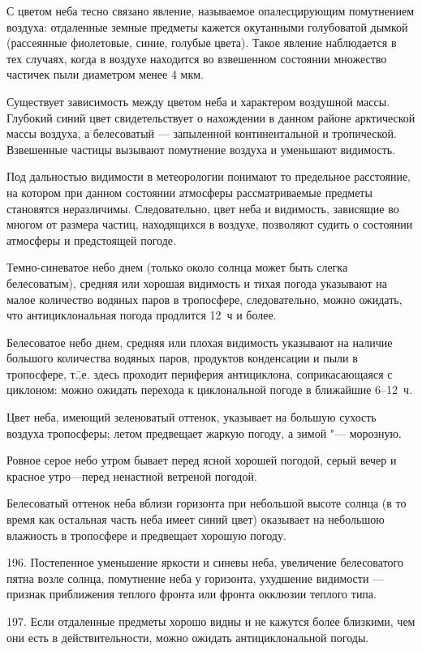 С цветом неба тесно связано явление, называемое опалесцирующим
помутнением воздуха: отдаленные земные предметы кажется окутанными
голубоватой дымкой (рассеянные фиолетовые, синие, голубые
цвета). Такое явление наблюдается в тех случаях, когда в воздухе
находится во взвешенном состоянии множество частичек пыли диаметром
менее 4 мкм.

Существует зависимость между цветом неба и характером воздушной
массы. Глубокий синий цвет свидетельствует о нахождении в данном
районе арктической массы воздуха, а белесоватый — запыленной
континентальной и тропической. Взвешенные частицы вызывают помутнение
воздуха и уменьшают видимость.

Под дальностью видимости в метеорологии понимают то предельное
расстояние, на котором при данном состоянии атмосферы рассматриваемые
предметы становятся неразличимы. Следовательно, цвет неба и видимость,
зависящие во многом от размера частиц, находящихся в воздухе,
позволяют судить о состоянии атмосферы и предстоящей погоде.

 Темно-синеватое небо днем (только около солнца может быть
слегка белесоватым), средняя или хорошая видимость и тихая погода
указывают на малое количество водяных паров в тропосфере,
следовательно, можно ожидать, что антициклональная погода продлится
12~ч и более.

 Белесоватое небо днем, средняя или плохая видимость указывают
на наличие большого количества водяных паров, продуктов конденсации и
пыли в тропосфере, т.\=,е. здесь проходит периферия антициклона,
соприкасающаяся с циклоном: можно ожидать перехода к циклональной
погоде в ближайшие 6--12~ч.

 Цвет неба, имеющий зеленоватый оттенок, указывает на большую
сухость воздуха тропосферы; летом предвещает жаркую погоду, а зимой "---
морозную.

 Ровное серое небо утром бывает перед ясной хорошей погодой, серый вечер и красное утро—перед ненастной ветреной погодой.

 Белесоватый оттенок неба вблизи горизонта при небольшой высоте солнца (в то время как остальная часть неба имеет синий цвет) оказывает на небольшою влажность в тропосфере и предвещает хорошую погоду.

196. Постепенное уменьшение яркости и синевы неба, увеличение белесоватого пятна возле солнца, помутнение неба у горизонта, ухудшение видимости — признак приближения теплого фронта или фронта окклюзии теплого типа.

197. Если отдаленные предметы хорошо видны и не кажутся более близкими, чем они есть в действительности, можно ожидать антициклональной погоды.

